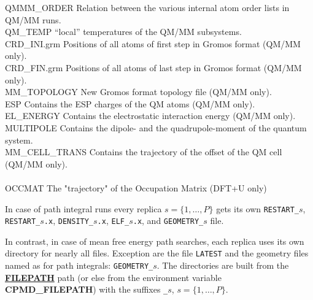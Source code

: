 \documentclass[twoside,10pt,titlepage,a4paper]{article}
\newcommand{\referto}[2]{\hyperlink{#1}{#2}}
\newcommand{\referto}[2]{\htmlref{#2}{#1}}
\newcommand{\refkeyword}[1]{%
\referto{#1}{\textbf{#1}}%
\index{#1}%
}%
\begin{document}
\begin{tabbing}
QMMM\_ORDER  \> Relation between the various internal atom order lists in QM/MM runs.\\
QM\_TEMP     \> ``local'' temperatures of the QM/MM subsystems.\\
CRD\_INI.grm \> Positions of all atoms of first step in Gromos format (QM/MM only).\\
CRD\_FIN.grm \> Positions of all atoms of last step in Gromos format (QM/MM only).\\
MM\_TOPOLOGY \> New Gromos format topology file (QM/MM only).\\
ESP          \> Contains the ESP charges of the QM atoms (QM/MM only).\\
EL\_ENERGY   \> Contains the electrostatic interaction energy (QM/MM only).\\
MULTIPOLE    \> Contains the dipole- and the quadrupole-moment of the quantum system.\\
MM\_CELL\_TRANS \> Contains the trajectory of the offset of the QM cell (QM/MM only).\\
\\
OCCMAT       \> The "trajectory" of the Occupation Matrix (DFT+U only)\\
\end{tabbing}

In case of path integral runs
every replica $s=\{1, \dots , P\}$ gets its own
\texttt{RESTART\_$s$},
\texttt{RESTART\_$s$.x},
\texttt{DENSITY\_$s$.x},
\texttt{ELF\_$s$.x},
and
\texttt{GEOMETRY\_$s$} file.

\smallskip

In contrast, in case of mean free energy path searches, each replica uses 
its own directory for nearly all files. Exception are the file 
\texttt{LATEST} and the geometry files named as for path integrals: 
\texttt{GEOMETRY\_$s$}. The directories are built from the 
\refkeyword{FILEPATH} path (or else from the environment variable 
{\bf CPMD\_FILEPATH}) with the suffixes \texttt{\_$s$}, $s=\{1, \dots , P\}$.

\medskip
\end{document}
